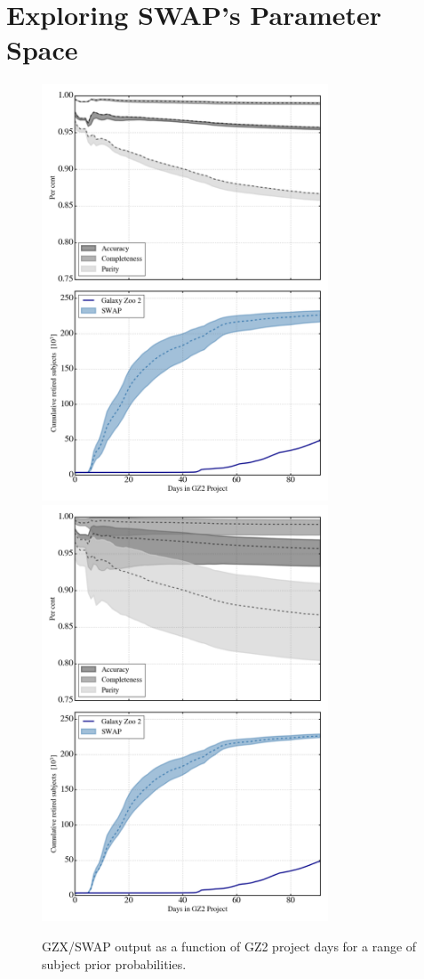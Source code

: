\documentclass[twocolumn]{aastex6}
\begin{document}
\section{Exploring SWAP's Parameter Space}
\label{sec: tweaking swap}

\begin{figure}[t]
\includegraphics[width=3.35in]{figures/GZX_eval_and_retirement_PLPD_spread_4paper_v2.png}
\includegraphics[width=3.35in]{figures/GZX_eval_and_retirement_prior_spread_4paper_v2.png}
\caption{GZX/SWAP output as a function of GZ2 project days for a range of subject prior probabilities.  \label{fig: tweak swap}}
\end{figure}
\end{document}
